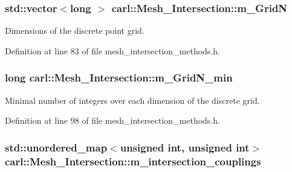 \subsubsection[{m\+\_\+\+Grid\+N}]{\setlength{\rightskip}{0pt plus 5cm}std\+::vector$<$long $>$ carl\+::\+Mesh\+\_\+\+Intersection\+::m\+\_\+\+Grid\+N\hspace{0.3cm}{\ttfamily [protected]}}\label{classcarl_1_1_mesh___intersection_a74b7064e400e0dbf8c62eb7efef1b784}


Dimensions of the discrete point grid. 



Definition at line 83 of file mesh\+\_\+intersection\+\_\+methods.\+h.

\hypertarget{classcarl_1_1_mesh___intersection_af5d973b0c2505d89bf1c9f7b29585b80}{}
\subsubsection[{m\+\_\+\+Grid\+N\+\_\+min}]{\setlength{\rightskip}{0pt plus 5cm}long carl\+::\+Mesh\+\_\+\+Intersection\+::m\+\_\+\+Grid\+N\+\_\+min\hspace{0.3cm}{\ttfamily [protected]}}\label{classcarl_1_1_mesh___intersection_af5d973b0c2505d89bf1c9f7b29585b80}


Minimal number of integers over each dimension of the discrete grid. 



Definition at line 98 of file mesh\+\_\+intersection\+\_\+methods.\+h.

\hypertarget{classcarl_1_1_mesh___intersection_ab0d6f92956f02022cfdfb2e3b84e1676}{}
\subsubsection[{m\+\_\+intersection\+\_\+couplings}]{\setlength{\rightskip}{0pt plus 5cm}std\+::unordered\+\_\+map$<$unsigned int, unsigned int$>$ carl\+::\+Mesh\+\_\+\+Intersection\+::m\+\_\+intersection\+\_\+couplings\hspace{0.3cm}{\ttfamily [protected]}}\label{classcarl_1_1_mesh___intersection_ab0d6f92956f02022cfdfb2e3b84e1676}


